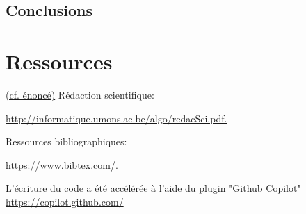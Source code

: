 \documentclass{article}
\begin{document}
    \newpage

    \subsection{Conclusions }



    \newpage



    \section{Ressources}
    \underline{(cf. énoncé)}
    Rédaction scientifique:

    \href{http://informatique.umons.ac.be/algo/redacSci.pdf.}{http://informatique.umons.ac.be/algo/redacSci.pdf.
    }

    Ressources bibliographiques:

    \href{https://www.bibtex.com/.}{https://www.bibtex.com/.}

    L'écriture du code a été accélérée à l'aide du plugin "Github Copilot"
    \href{https://copilot.github.com/}{https://copilot.github.com/}
\end{document}
